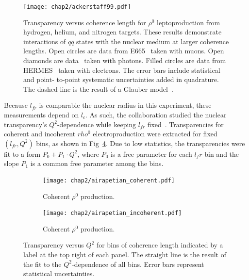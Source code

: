 \begin{figure}[!h]
    \centering
    \texttt{[image: chap2/ackerstaff99.pdf]}
    \caption[Transparency versus coherence length for $\rho^0$ leptoproduction
             from hydrogen, helium, and nitrogen targets.]{Transparency versus coherence length for $\rho^0$ leptoproduction
             from hydrogen, helium, and nitrogen targets.
             These results demonstrate interactions of $q\bar{q}$ states with
             the nuclear medium at larger coherence lengths.
             Open circles are data from E665~\cite{Adams_1995} taken with muons.
             Open diamonds are data~\cite{McClellan_1969} taken with photons.
             Filled circles are data from HERMES~\cite{Ackerstaff_1999} taken
             with electrons.
             The error bars include statistical and point- to-point systematic
             uncertainties added in quadrature.
             The dashed line is the result of a Glauber model~\cite{Hufner_1996}.
            }
    \label{fig:ackerstaff99}
\end{figure}


Because $l_{fr}$ is comparable the nuclear radius in this experiment, these
measurements depend on $l_c$.
As such, the collaboration studied the nuclear transparency's $Q^2$-dependence
while keeping $l_{fr}$ fixed~\cite{Airapetian_2003}.
Transparencies for coherent and incoherent $rho^0$ electroproduction were
extracted for fixed $(l_{fr},Q^2)$ bins, as shown in
Fig~\ref{fig:airapetian_T_vs_lfr}.
Due to low statistics, the transparencies were fit to a form
$P_0 + P_1 \cdot Q^2$, where $P_0$ is a free parameter for each $l_fr$ bin and
the slope $P_1$ is a common free parameter among the bins.

\begin{figure}[!h]
    \centering
    \begin{subfigure}[b]{0.475\textwidth}
        \centering
        \texttt{[image: chap2/airapetian\_coherent.pdf]}
        \caption{Coherent $\rho^0$ production.}
        \label{fig:airapetian_coherent}
    \end{subfigure}
    \begin{subfigure}[b]{0.475\textwidth}
        \centering
        \texttt{[image: chap2/airapetian\_incoherent.pdf]}
        \caption{Coherent $\rho^0$ production.}
        \label{fig:airapetian_incoherent}
    \end{subfigure}
    \caption[Transparency versus $Q^2$ for varying bins of coherence length.]{
             Transparency versus $Q^2$ for bins of coherence length
             indicated by a label at the top right of each panel.
             The straight line is the result of the fit to the $Q^2$-dependence
             of all bins.
             Error bars represent statistical uncertainties.
            }
    \label{fig:airapetian_T_vs_lfr}
\end{figure}

